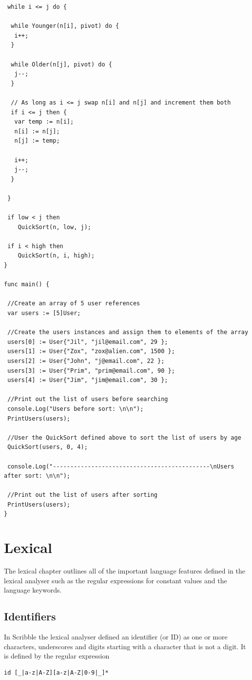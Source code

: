 \documentclass[]{final_report}
\begin{document}
\begin{verbatim}
 while i <= j do {

  while Younger(n[i], pivot) do {
   i++;
  }
  
  while Older(n[j], pivot) do {
   j--;
  }

  // As long as i <= j swap n[i] and n[j] and increment them both
  if i <= j then {
   var temp := n[i];
   n[i] := n[j];
   n[j] := temp;
   
   i++;
   j--;
  }

 }
 
 if low < j then 
 	QuickSort(n, low, j);
 
 if i < high then 
 	QuickSort(n, i, high);
}

func main() {

 //Create an array of 5 user references
 var users := [5]User;
 
 //Create the users instances and assign them to elements of the array
 users[0] := User{"Jil", "jil@email.com", 29 };
 users[1] := User{"Zox", "zox@alien.com", 1500 };
 users[2] := User{"John", "j@email.com", 22 };
 users[3] := User{"Prim", "prim@email.com", 90 };
 users[4] := User{"Jim", "jim@email.com", 30 };
 
 //Print out the list of users before searching
 console.Log("Users before sort: \n\n");
 PrintUsers(users);

 //User the QuickSort defined above to sort the list of users by age
 QuickSort(users, 0, 4);
 
 console.Log("---------------------------------------------\nUsers after sort: \n\n");
 
 //Print out the list of users after sorting
 PrintUsers(users);
}
\end{verbatim}

\section{Lexical}

The lexical chapter outlines all of the important language features defined in the lexical analyser such as the regular expressions for constant values and the language keywords.

\subsection{Identifiers}

In Scribble the lexical analyser defined an identifier (or ID) as one or more characters, underscores and digits starting with a character that is not a digit. It is defined by the regular expression
\begin{verbatim}
id [_|a-z|A-Z][a-z|A-Z|0-9|_]*
\end{verbatim}
\end{document}
